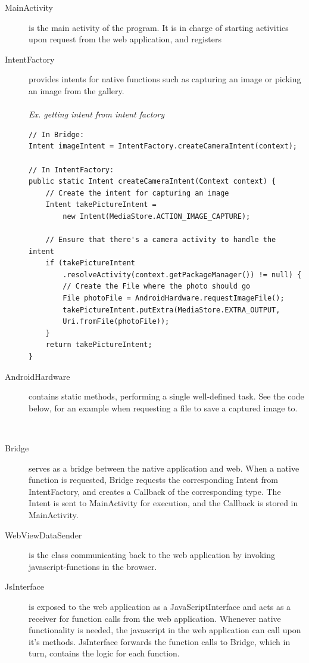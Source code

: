 \begin{description}
	\item[MainActivity] is the main activity of the program. It is in charge of starting activities upon request from the web application, and registers 
	\item[IntentFactory] provides intents for native functions such as capturing an image or picking an image from the gallery. 
	\\\\
	\emph{Ex. getting intent from intent factory}
	
	\begin{lstlisting}
// In Bridge:
Intent imageIntent = IntentFactory.createCameraIntent(context);
		
// In IntentFactory:
public static Intent createCameraIntent(Context context) {
	// Create the intent for capturing an image
	Intent takePictureIntent = 
		new Intent(MediaStore.ACTION_IMAGE_CAPTURE);
	
	// Ensure that there's a camera activity to handle the intent
	if (takePictureIntent
		.resolveActivity(context.getPackageManager()) != null) {
		// Create the File where the photo should go
		File photoFile = AndroidHardware.requestImageFile();
		takePictureIntent.putExtra(MediaStore.EXTRA_OUTPUT,
		Uri.fromFile(photoFile));
	}
	return takePictureIntent;
}
\end{lstlisting}
	
	\item[AndroidHardware] contains static methods, performing a single well-defined task. See the code below, for an example when requesting a file to save a captured image to.
	\begin{lstlisting}
	
	\end{lstlisting}
	
	\item[Bridge] serves as a bridge between the native application and web. When a native function is requested, Bridge requests the corresponding Intent from IntentFactory, and creates a Callback of the corresponding type. The Intent is sent to MainActivity for execution, and the Callback is stored in MainActivity.
	
	\item[WebViewDataSender] is the class communicating back to the web application by invoking javascript-functions in the browser.
	
	\item[JsInterface] is exposed to the web application as a JavaScriptInterface and acts as a receiver for function calls from the web application. Whenever native functionality is needed, the javascript in the web application can call upon it's methods. JsInterface forwards the function calls to Bridge, which in turn, contains the logic for each function.
	

\end{description}
